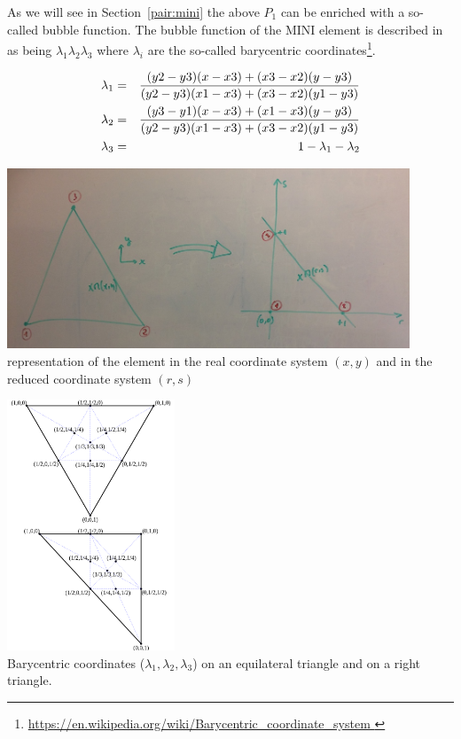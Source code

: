 As we will see in Section~\ref{pair:mini} the above $P_1$ can be enriched 
with a so-called bubble function.
The  bubble function of the MINI element 
is described in \cite{arbf84} as being $\lambda_1\lambda_2\lambda_3$
where $\lambda_i$ are the so-called barycentric 
coordinates\footnote{\url{https://en.wikipedia.org/wiki/Barycentric\_coordinate\_system }}.

\begin{eqnarray}
\lambda_1 &=& \frac{(y2-y3)(x-x3)+(x3-x2)(y-y3)}{(y2-y3)(x1-x3)+(x3-x2)(y1-y3)} \nonumber\\
\lambda_2 &=& \frac{(y3-y1)(x-x3)+(x1-x3)(y-y3)}{(y2-y3)(x1-x3)+(x3-x2)(y1-y3)} \nonumber\\
\lambda_3 &=& 1-\lambda_1-\lambda_2 \nonumber
\end{eqnarray}

\begin{center}
\includegraphics[width=12cm]{images/mini/minielement2}\\
{\small representation of the element in the real coordinate system $(x,y)$
and in the reduced coordinate system $(r,s)$}
\end{center}

\begin{center}
\includegraphics[width=5cm]{images/mini/barycoord}\\
{\small Barycentric coordinates ($\lambda _{1},\lambda _{2},\lambda _{3}$) on an equilateral triangle and on a right triangle.}
\end{center}

